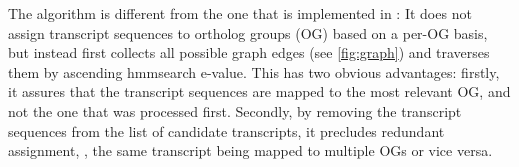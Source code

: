 The \pname algorithm is different from the one that is implemented in \hamstr:
It does not assign transcript sequences to ortholog groups (OG) based on a
per-OG basis, but instead first collects all possible graph edges (see
\autoref{fig:graph}) and traverses them by ascending hmmsearch e-value. This has
two obvious advantages: firstly, it assures that the transcript sequences are
mapped to the most relevant OG, and not the one that was processed first.
Secondly, by removing the transcript sequences from the list of candidate
transcripts, it precludes redundant assignment, \ie, the same transcript being
mapped to multiple OGs or vice versa.
